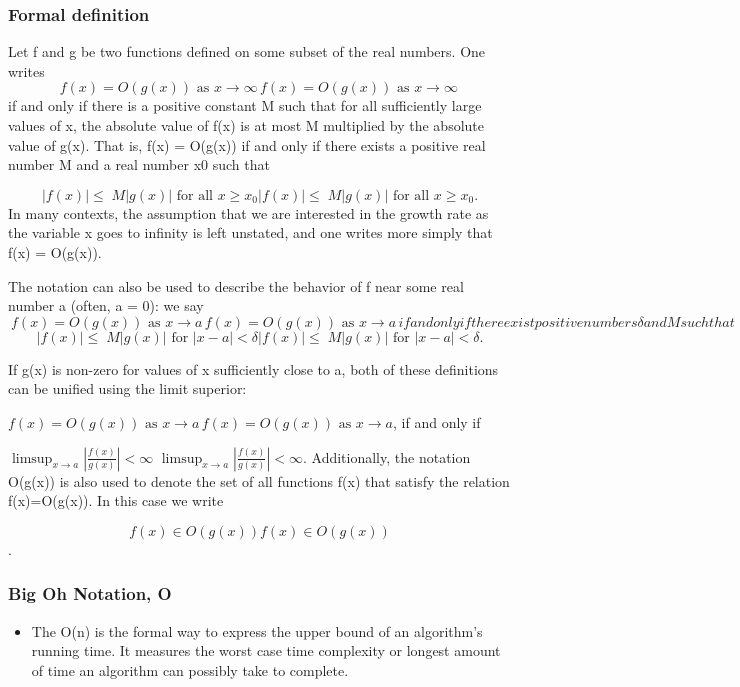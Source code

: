 \documentclass{beamer}
\begin{document}
\begin{frame}
\frametitle{Formal definition}
Let f and g be two functions defined on some subset of the real numbers. One writes
\[
{\displaystyle f(x)=O(g(x)){\text{ as }}x\to \infty \,} f(x)=O(g(x)){\text{ as }}x\to \infty \,
\]
if and only if there is a positive constant M such that for all sufficiently large values of x, the absolute value of f(x) is at most M multiplied by the absolute value of g(x). That is, f(x) = O(g(x)) if and only if there exists a positive real number M and a real number x0 such that
\end{frame}
\begin{frame}
\[{\displaystyle |f(x)|\leq \;M|g(x)|{\text{ for all }}x\geq x_{0}} {\displaystyle |f(x)|\leq \;M|g(x)|{\text{ for all }}x\geq x_{0}}.\]
In many contexts, the assumption that we are interested in the growth rate as the variable x goes to infinity is left unstated, and one writes more simply that f(x) = O(g(x)).
\end{frame}
\begin{frame}

The notation can also be used to describe the behavior of f near some real number a (often, a = 0): we say
\[\
{\displaystyle f(x)=O(g(x)){\text{ as }}x\to a\,} f(x)=O(g(x)){\text{ as }}x\to a\,
if and only if there exist positive numbers δ and M such that
\]
\[
{\displaystyle |f(x)|\leq \;M|g(x)|{\text{ for }}|x-a|<\delta } {\displaystyle |f(x)|\leq \;M|g(x)|{\text{ for }}|x-a|<\delta }.
\]
\end{frame}
\begin{frame}
If g(x) is non-zero for values of x sufficiently close to a, both of these definitions can be unified using the limit superior:

${\displaystyle f(x)=O(g(x)){\text{ as }}x\to a\,} f(x)=O(g(x)){\text{ as }}x\to a $,
if and only if

${\displaystyle \limsup _{x\to a}\left|{\frac {f(x)}{g(x)}}\right|<\infty }$ ${\displaystyle \limsup _{x\to a}\left|{\frac {f(x)}{g(x)}}\right|<\infty }$.
Additionally, the notation O(g(x)) is also used to denote the set of all functions f(x) that satisfy the relation f(x)=O(g(x)). In this case we write

\[{\displaystyle f(x)\in O(g(x))} f(x)\in O(g(x))\].
\end{frame}
\begin{frame}
\frametitle{Big Oh Notation, Ο}
\begin{itemize}
\item The Ο(n) is the formal way to express the upper bound of an algorithm's running time. It measures the worst case time complexity or longest amount of time an algorithm can possibly take to complete.
\end{itemize}
\end{frame}
\end{document}
